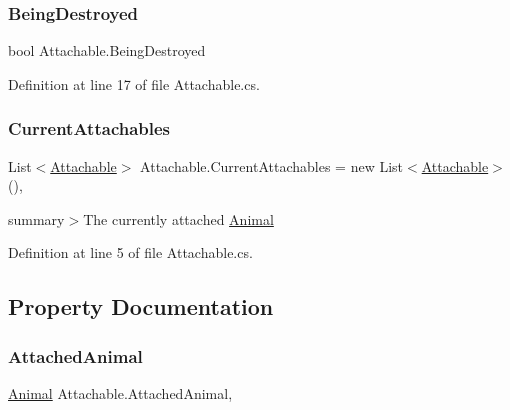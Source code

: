\subsubsection{\texorpdfstring{Being\+Destroyed}{BeingDestroyed}}
{\footnotesize\ttfamily bool Attachable.\+Being\+Destroyed\hspace{0.3cm}{\ttfamily [protected]}}



Definition at line 17 of file Attachable.\+cs.

\mbox{\label{class_attachable_a0dd1e27d821e792b4ec611836053ea86}} 
\subsubsection{\texorpdfstring{Current\+Attachables}{CurrentAttachables}}
{\footnotesize\ttfamily List$<$\mbox{\hyperlink{class_attachable}{Attachable}}$>$ Attachable.\+Current\+Attachables = new List$<$\mbox{\hyperlink{class_attachable}{Attachable}}$>$()\hspace{0.3cm}{\ttfamily [static]}, {\ttfamily [protected]}}



summary$>$The currently attached \mbox{\hyperlink{class_animal}{Animal}}



Definition at line 5 of file Attachable.\+cs.



\subsection{Property Documentation}
\mbox{\label{class_attachable_a767ba973f26c60f69dd597c9bb3cdf61}} 
\subsubsection{\texorpdfstring{Attached\+Animal}{AttachedAnimal}}
{\footnotesize\ttfamily \mbox{\hyperlink{class_animal}{Animal}} Attachable.\+Attached\+Animal\hspace{0.3cm}{\ttfamily [get]}, {}}



